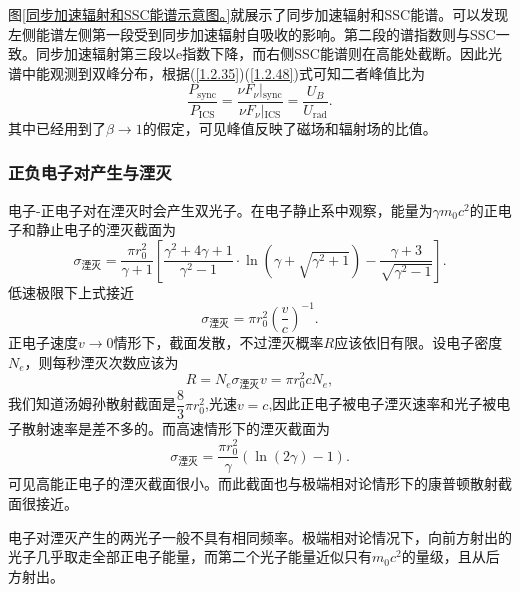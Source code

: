 \documentclass[../天体物理基础.tex]{subfiles}
\begin{document}
图\ref{同步加速辐射和SSC能谱示意图。}就展示了同步加速辐射和SSC能谱。可以发现左侧能谱左侧第一段受到同步加速辐射自吸收的影响。第二段的谱指数则与SSC一致。同步加速辐射第三段以$\mathrm{e}$指数下降，而右侧SSC能谱则在高能处截断。因此光谱中能观测到双峰分布，根据(\ref{1.2.35})(\ref{1.2.48})式可知二者峰值比为
\begin{equation}
\frac{P_{\text{sync}}}{P_{\text{ICS}}}=\frac{\left.\nu F_{\nu}\right\vert{}_{\text{sync}}}{\left.\nu F_{\nu}\right\vert{}_{\text{ICS}}}=\frac{U_{B}}{U_{\text{rad}}}.
\end{equation}
其中已经用到了$\beta\to1$的假定，可见峰值反映了磁场和辐射场的比值。

\subsubsection{正负电子对产生与湮灭}
电子-正电子对在湮灭时会产生双光子。在电子静止系中观察，能量为$\gamma m_{0}c^{2}$的正电子和静止电子的湮灭截面为
\begin{equation}
\sigma_{\text{湮灭}}=\frac{\pi r_{0}^{2}}{\gamma+1}\left[\frac{\gamma^{2}+4\gamma+1}{\gamma^{2}-1}\cdot \ln\left(\gamma+\sqrt{\gamma^{2}+1}\right)-\frac{\gamma+3}{\sqrt{\gamma^{2}-1}}\right].
\end{equation}
低速极限下上式接近
\begin{equation}
\sigma_{\text{湮灭}}=\pi r_{0}^{2}\left(\frac{v}{c}\right)^{-1}.
\end{equation}
正电子速度$v\to0$情形下，截面发散，不过湮灭概率$R$应该依旧有限。设电子密度$N_{e}$，则每秒湮灭次数应该为
\begin{equation}
R=N_{e}\sigma_{\text{湮灭}}v=\pi r_{0}^{2}cN_{e},
\end{equation}
我们知道汤姆孙散射截面是$\dfrac{8}{3}\pi r_{0}^{2}$,光速$v=c$,因此正电子被电子湮灭速率和光子被电子散射速率是差不多的。而高速情形下的湮灭截面为
\begin{equation}
\sigma_{\text{湮灭}}=\frac{\pi r_{0}^{2}}{\gamma}\left(\ln\left(2\gamma\right)-1\right).
\end{equation}
可见高能正电子的湮灭截面很小。而此截面也与极端相对论情形下的康普顿散射截面很接近。

电子对湮灭产生的两光子一般不具有相同频率。极端相对论情况下，向前方射出的光子几乎取走全部正电子能量，而第二个光子能量近似只有$m_{0}c^{2}$的量级，且从后方射出。
\end{document}
